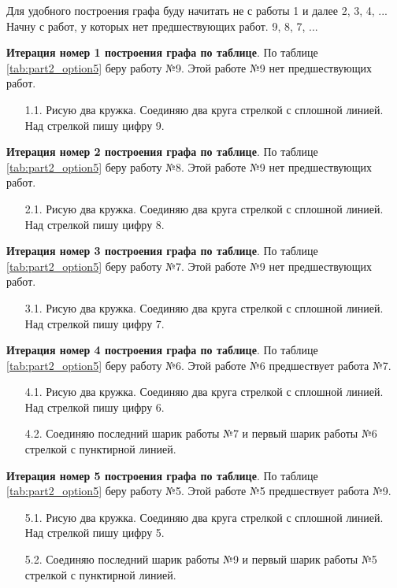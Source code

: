 Для удобного построения графа буду начитать не с работы 1 и далее 2, 3, 4, ... Начну с работ, у которых нет предшествующих работ. 9, 8, 7, ...


\textbf{Итерация номер 1 построения графа по таблице}. По таблице \ref{tab:part2_option5} беру работу №9. Этой работе №9 нет предшествующих работ.

\begin{enumerate}
  \item[1.1.] Рисую два кружка. Соединяю два круга стрелкой с сплошной линией. Над стрелкой пишу цифру 9.
\end{enumerate}

\textbf{Итерация номер 2 построения графа по таблице}. По таблице \ref{tab:part2_option5} беру работу №8. Этой работе №9 нет предшествующих работ.

\begin{enumerate}
  \item[2.1.] Рисую два кружка. Соединяю два круга стрелкой с сплошной линией. Над стрелкой пишу цифру 8.
\end{enumerate}

\textbf{Итерация номер 3 построения графа по таблице}. По таблице \ref{tab:part2_option5} беру работу №7. Этой работе №9 нет предшествующих работ.

\begin{enumerate}
  \item[3.1.] Рисую два кружка. Соединяю два круга стрелкой с сплошной линией. Над стрелкой пишу цифру 7.
\end{enumerate}

\textbf{Итерация номер 4 построения графа по таблице}. По таблице \ref{tab:part2_option5} беру работу №6. Этой работе №6 предшествует работа №7.

\begin{enumerate}
  \item[4.1.] Рисую два кружка. Соединяю два круга стрелкой с сплошной линией. Над стрелкой пишу цифру 6.
  \item[4.2.] Соединяю последний шарик работы №7 и первый шарик работы №6 стрелкой с пунктирной линией.
\end{enumerate}

\textbf{Итерация номер 5 построения графа по таблице}. По таблице \ref{tab:part2_option5} беру работу №5. Этой работе №5 предшествует работа №9.

\begin{enumerate}
  \item[5.1.] Рисую два кружка. Соединяю два круга стрелкой с сплошной линией. Над стрелкой пишу цифру 5.
  \item[5.2.] Соединяю последний шарик работы №9 и первый шарик работы №5 стрелкой с пунктирной линией.
\end{enumerate}

